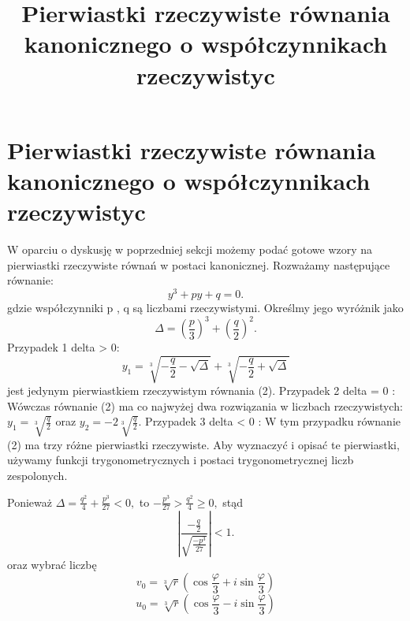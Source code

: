 \documentclass{article}
\begin{document}
\title{Pierwiastki rzeczywiste równania kanonicznego o współczynnikach rzeczywistyc}
\maketitle

\section{Pierwiastki rzeczywiste równania kanonicznego o współczynnikach rzeczywistyc}
W oparciu o dyskusję w poprzedniej sekcji możemy podać gotowe wzory na pierwiastki rzeczywiste równań w postaci kanonicznej. Rozważamy następujące równanie: 
$${ y^{3}+py+q=0.}$$
gdzie współczynniki p , q są liczbami rzeczywistymi. Określmy jego wyróżnik jako $${ \Delta =\left({\frac {p}{3}}\right)^{3}+\left({\frac {q}{2}}\right)^{2}.}$$
Przypadek 1 delta > 0:
$$y_1=\sqrt[3]{-\frac{q}{2}-\sqrt{\Delta}}+\sqrt[3]{-\frac{q}{2}+\sqrt{\Delta}}$$
jest jedynym pierwiastkiem rzeczywistym równania (2). 
Przypadek 2   delta = 0 : 
Wówczas równanie (2) ma co najwyżej dwa rozwiązania w liczbach rzeczywistych: 
$y_1=\sqrt[3]{\frac{q}{2}}$ oraz $y_2=-2\sqrt[3]{\frac{q}{2}}.$
Przypadek 3   delta < 0 :
W tym przypadku równanie (2) ma trzy różne pierwiastki rzeczywiste. Aby wyznaczyć i opisać te pierwiastki, używamy funkcji trygonometrycznych i postaci trygonometrycznej liczb zespolonych.

Ponieważ $\Delta=\frac{q^2}{4}+\frac{p^3}{27}<0,$ to $-\frac{p^3}{27}>\frac{q^2}{4}\geqslant 0,$ stąd
$${ \left|{\frac {-{\frac {q}{2}}}{\sqrt {\frac {-p^{3}}{27}}}}\right|<1.}$$
oraz wybrać liczbę
$$v_0=\sqrt[3]{r}\left(\cos\frac{\varphi}{3}+i\sin\frac{\varphi}{3}\right)$$
$$u_0=\sqrt[3]{r}\left(\cos\frac{\varphi}{3}-i\sin\frac{\varphi}{3}\right)$$
\end{document}
